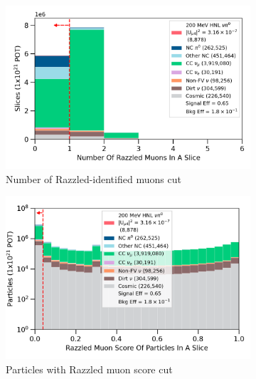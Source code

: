 \begin{figure}[t!]
        \begin{subfigure}[b]{0.495\textwidth}   
            \centering 
            \includegraphics[width=\textwidth]{nrazzled_muon_precut}
            \caption{Number of Razzled-identified muons cut}%
            \label{fig:nrazzled_muon_full}
        \end{subfigure}
        \hfill
        \begin{subfigure}[b]{0.495\textwidth}   
            \centering 
            \includegraphics[width=\textwidth]{razzled_muon_score_precut}
            \caption{Particles with Razzled muon score cut}%
            \label{fig:razzled_muon_score_full}
        \end{subfigure}
        \hfill
	\centering
        \begin{subfigure}[b]{0.495\textwidth}   
            \centering 

\end{subfigure}
\end{figure}
